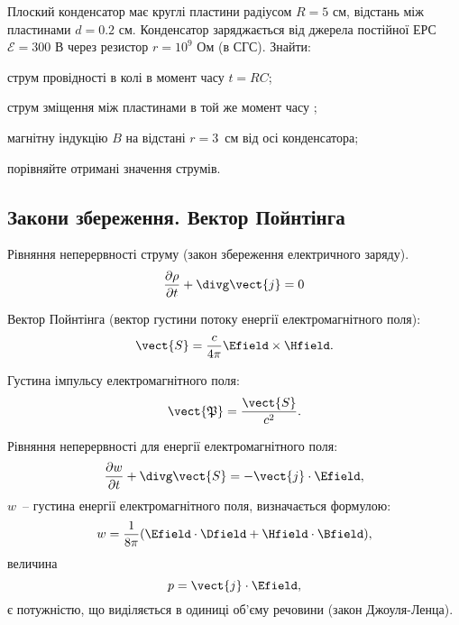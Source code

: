 \begin{problem}%
    Плоский конденсатор має круглі пластини радіусом $R = 5$ см, відстань між пластинами $d = 0.2$ см. Конденсатор заряджається від джерела постійної ЕРС $\mathcal{E} = 300$ В через резистор $r = 10^9$ Ом (в СГС).
    Знайти:
    \begin{enumerate*}[label=\alph*)]
        \item струм провідності в колі в момент часу $t = RC$;
        \item струм зміщення між пластинами в той же момент часу ;
        \item магнітну індукцію $B$ на відстані $r = 3$~см від осі конденсатора;
        \item порівняйте отримані значення струмів.
    \end{enumerate*}
%
\end{problem}



\subsection*{Закони збереження. Вектор Пойнтінга}

\begin{Theory}
Рівняння неперервності струму (закон збереження електричного заряду).
	\begin{equation} \label{charge_conservation_law}
		\frac{\partial \rho}{\partial t} + \divg\vect{j} = 0
	\end{equation}

Вектор Пойнтінга (вектор густини потоку енергії електромагнітного поля):
	\begin{equation}
			\vect{S} = \frac{c}{4\pi} \Efield\times\Hfield.
	\end{equation}

Густина імпульсу електромагнітного поля:
\begin{equation}
	\vect{\mathfrak{P}} = \frac{\vect{S}}{c^2}.
\end{equation}

Рівняння неперервності для енергії електромагнітного поля:
	\begin{equation}
		\frac{\partial w}{\partial t} + \divg\vect{S} = -  \vect{j}\cdot\Efield,
	\end{equation}
$ w $~-- густина енергії електромагнітного поля, визначається формулою:
	\begin{equation}
		w = \frac{1}{8\pi} (\Efield\cdot\Dfield + \Hfield\cdot\Bfield),
	\end{equation}
величина
	\begin{equation}
		p =\vect{j}\cdot\Efield ,
	\end{equation}
є потужністю, що виділяється в одиниці об'єму речовини (закон Джоуля-Ленца).
\end{Theory}


